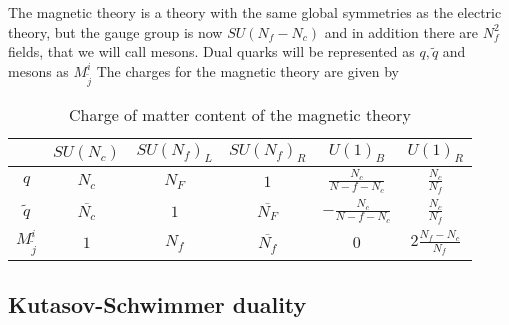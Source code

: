 The magnetic theory is a theory with the same global symmetries as the electric theory, but the gauge group is now $SU(N_f - N_c)$ and in addition there are $N_f^2$ fields, that we will call mesons. 
Dual quarks will be represented as $q,\tilde{q}$ and mesons as $M^i_{\tilde{j}} $
The charges for the magnetic theory are given by


\begin{table}[h!]
 \begin{tabular}{c | c |  c c c c }
 & $SU(N_c) $& $SU(N_f)_L$  &$SU(N_f)_R $  & $U(1)_B$ &  $U(1)_R$ \\
\hline
$q$ & $N_c$ & $N_F$ & $1$   &  $ \frac{N_c}{N-f-N_c} $  & $ \frac{N_c}{N_f}$  \\
$\tilde{q}$ &$\overline{N_c} $ &  $1$ & $\overline{ N_F}$   & $- \frac{N_c}{N-f-N_c}$   &  $ \frac{N_c}{N_f}$   \\	 
$M^i_{\tilde{j}} $ & $1$ & $N_f$ & $\overline{N_f} $ & $0$ & $ 2 \frac{N_f - N_c}{N_f} $
 \end{tabular}
	\centering
 \caption{Charge of matter content of the magnetic theory}
\end{table}










\subsection*{Kutasov-Schwimmer duality}



%